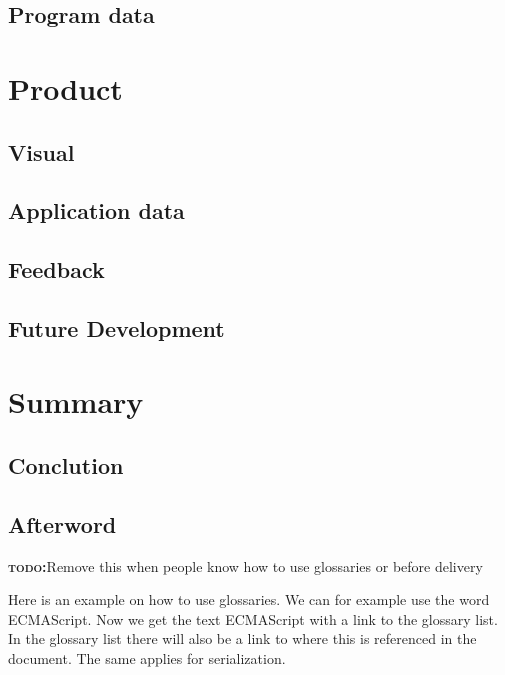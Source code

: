 \documentclass[BSP,english,oneside]{classes/gucthesis}
\newcommand{\todo}[1]{{\par\noindent\textbf{\textsc{\color{Gray}todo:}}\color{green}#1}}
\begin{document}
	\chapter{Program data}
		\label{chap:program_data}
		


\part{Product}

	\chapter{Visual}
		\label{chap:visual}
		

	\chapter{Application data}
		\label{chap:application_data}
		

	\chapter{Feedback}
		\label{chap:feedback}
		

	\chapter{Future Development}
		\label{chap:future_development}
		


\part{Summary}

	\chapter{Conclution}
		\label{chap:conclution}
		

	\chapter{Afterword}
		\label{chap:afterword}
		


\todo{Remove this when people know how to use glossaries or before delivery}
Here is an example on how to use glossaries. We can for example use the word
\gls{ECMAScript}. Now we get the text ECMAScript with a link to the glossary
list. In the glossary list there will also be a link to where this is 
referenced in the document. The same applies for \gls{serialization}.
\end{document}
